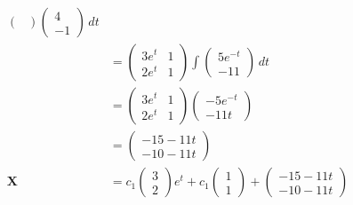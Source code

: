 \documentclass{article}
\begin{document}
\begin{align*}
\begin{pmatrix}
                                         \end{pmatrix} \begin{pmatrix}
                                                         4 \\
                                                         -1
                                                       \end{pmatrix} \,dt         \\
                  & = \begin{pmatrix}
                        3 e^t & 1 \\
                        2 e^t & 1
                      \end{pmatrix} \int \begin{pmatrix}
                                           5 e^{-t} \\
                                           -11
                                         \end{pmatrix} \,dt                       \\
                  & = \begin{pmatrix}
                        3 e^t & 1 \\
                        2 e^t & 1
                      \end{pmatrix} \begin{pmatrix}
                                      -5 e^{-t} \\
                                      -11 t
                                    \end{pmatrix}                                \\
                  & = \begin{pmatrix}
                        -15 - 11 t \\
                        -10 - 11 t
                      \end{pmatrix}                                              \\
  \mathbf{X}      & = c_1 \begin{pmatrix}
                            3 \\
                            2
                          \end{pmatrix} e^t + c_1 \begin{pmatrix}
                                                    1 \\
                                                    1
                                                  \end{pmatrix} + \begin{pmatrix}
                                                                    -15 - 11 t \\
                                                                    -10 - 11 t
                                                                  \end{pmatrix}
\end{align*}
\end{document}
